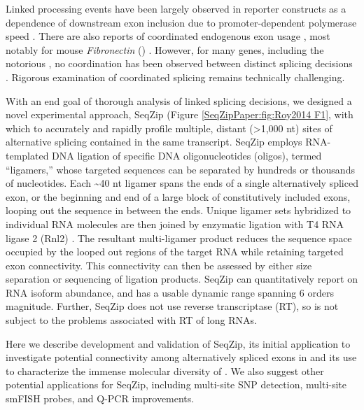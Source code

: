 	Linked processing events have been largely observed in reporter constructs as a dependence of downstream exon inclusion due to promoter-dependent polymerase speed \citep{Kornblihtt2013}. There are also reports of coordinated endogenous exon usage \citep{Fagnani2007}, most notably for mouse \textit{Fibronectin} (\fn{}) \citep{Fededa2005}. However, for many genes, including the notorious \flies{} \dscam{}, no coordination has been observed between distinct splicing decisions \citep{Miura2013b,Sun2013}. Rigorous examination of coordinated splicing remains technically challenging.

	With an end goal of thorough analysis of linked splicing decisions, we designed a novel experimental approach, SeqZip (Figure \ref{SeqZipPaper:fig:Roy2014 F1}, with which to accurately and rapidly profile multiple, distant (>1,000 nt) sites of alternative splicing contained in the same transcript. SeqZip employs RNA-templated DNA ligation of specific DNA oligonucleotides (oligos), termed ``ligamers,'' whose targeted sequences can be separated by hundreds or thousands of nucleotides. Each \textasciitilde 40 nt ligamer spans the ends of a single alternatively spliced exon, or the beginning and end of a large block of constitutively included exons, looping out the sequence in between the ends. Unique ligamer sets hybridized to individual RNA molecules are then joined by enzymatic ligation with T4 RNA ligase 2 (Rnl2) \citep{Ho2002b}. The resultant multi-ligamer product reduces the sequence space occupied by the looped out regions of the target RNA while retaining targeted exon connectivity. This connectivity can then be assessed by either size separation or sequencing of ligation products. SeqZip can quantitatively report on RNA isoform abundance, and has a usable dynamic range spanning 6 orders magnitude. Further, SeqZip does not use reverse transcriptase (RT), so is not subject to the problems associated with RT of long RNAs.

	Here we describe development and validation of SeqZip, its initial application to investigate potential connectivity among alternatively spliced exons in \fn{} and its use to characterize the immense molecular diversity of \dscam{}. We also suggest other potential applications for SeqZip, including multi-site SNP detection, multi-site smFISH probes, and Q-PCR improvements.

